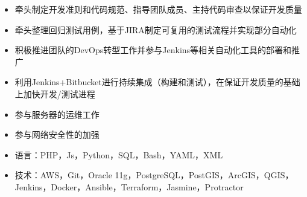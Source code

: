 \documentclass[letterpaper]{twentysecondcv} %
\begin{document}
\begin{twentyfluid}
{{\begin{itemize}
            \item 牵头制定开发准则和代码规范、指导团队成员、主持代码审查以保证开发质量
            \item 牵头整理回归测试用例，基于JIRA制定可复用的测试流程并实现部分自动化
            \item 积极推进团队的DevOps转型工作并参与Jenkins等相关自动化工具的部署和推广
            \item 利用Jenkins+Bitbucket进行持续集成（构建和测试），在保证开发质量的基础上加快开发/测试进程
            \item 参与服务器的运维工作
            \item 参与网络安全性的加强
            \item 语言：PHP，Js，Python，SQL，Bash，YAML，XML
            \item 技术：AWS，Git，Oracle 11g，PostgreSQL，PostGIS，ArcGIS，QGIS，Jenkins，Docker，Ansible，Terraform，Jasmine，Protractor
        \end{itemize}
    	}
        }
\end{twentyfluid}

\vspace{-0.2cm}
\end{document}

